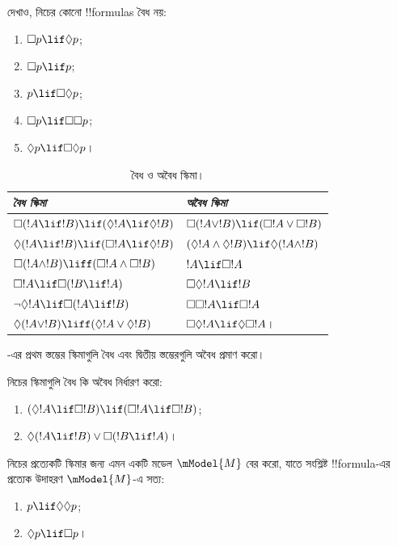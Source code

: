 \documentclass[../../../include/open-logic-section]{subfiles}
\begin{document}
\begin{prob}
  দেখাও, নিচের কোনো !!{formula}s বৈধ নয়:
  \begin{enumerate}
    \item[\Ax{D}:] \quad $\Box p \lif \Diamond p$;
    \item[\Ax{T}:] \quad $\Box p \lif p$;
    \item[\Ax{B}:] \quad $p \lif \Box\Diamond p$;
    \item[\Ax{4}:] \quad $\Box p \lif \Box \Box p$;
    \item[\Ax{5}:] \quad $\Diamond p \lif \Box \Diamond
      p$।
  \end{enumerate}
\end{prob}

\begin{table}[t]
    \centering
    \begin{tabular}{| l || l |}
      \hline
      {\emph{বৈধ স্কিমা}} & {\emph{অবৈধ স্কিমা}} \\
      \hline\hline
      $\Box(!A \lif !B) \lif (\Diamond !A \lif \Diamond !B)$
      & $\Box (!A \lor !B) \lif (\Box !A \lor \Box !B)$ \\
      $\Diamond (!A \lif !B) \lif (\Box !A \lif \Diamond
      !B)$
      & $(\Diamond !A \land \Diamond !B) \lif \Diamond (!A
      \land !B)$\\
      $\Box (!A \land !B) \liff (\Box !A \land \Box !B)$
      & $!A \lif \Box !A$ \\
      $\Box !A \lif \Box (!B \lif !A)$
      & $\Box \Diamond !A \lif !B$ \\
      $\lnot \Diamond !A \lif \Box (!A \lif !B)$
      & $\Box \Box !A \lif \Box !A$ \\
      $\Diamond (!A \lor !B) \liff (\Diamond !A \lor
      \Diamond !B)$
      & $\Box \Diamond !A \lif \Diamond \Box !A$। \\
      \hline
    \end{tabular}
    \caption{বৈধ ও অবৈধ স্কিমা।} %
\end{table}

\begin{prob}%
  -এর প্রথম স্তম্ভের
  স্কিমাগুলি বৈধ এবং দ্বিতীয় স্তম্ভেরগুলি অবৈধ প্রমাণ করো।
\end{prob}

\begin{prob}
  নিচের স্কিমাগুলি বৈধ কি অবৈধ নির্ধারণ করো:
  \begin{enumerate}
  \item $(\Diamond !A \lif \Box !B) \lif (\Box !A \lif \Box
    !B)$;
  \item $\Diamond(!A \lif !B) \lor \Box(!B \lif !A)$।
  \end{enumerate}
\end{prob}

\begin{prob}
  নিচের প্রত্যেকটি স্কিমার জন্য এমন একটি মডেল $\mModel{M}$ বের করো,
  যাতে সংশ্লিষ্ট !!{formula}-এর প্রত্যেক উদাহরণ $\mModel{M}$-এ সত্য:
  \begin{enumerate}
  \item $p \lif \Diamond\Diamond p$;
  \item $\Diamond p \lif \Box p$।
  \end{enumerate}
\end{prob}
\end{document}
